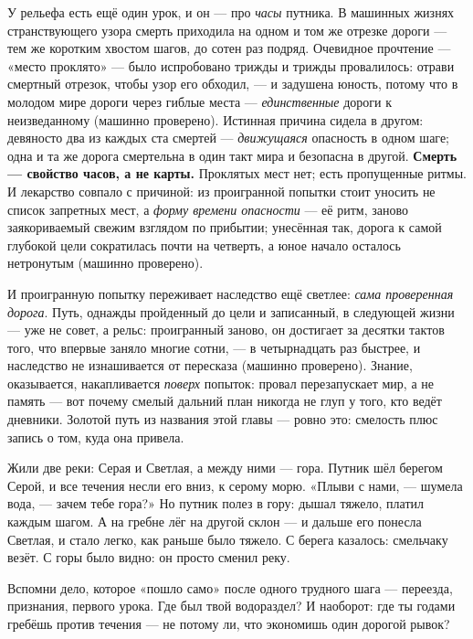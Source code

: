 \documentclass[11pt,letterpaper]{article}
\begin{document}
У рельефа есть ещё один урок, и он --- про \emph{часы} путника.
В машинных жизнях странствующего узора смерть приходила на одном и
том же отрезке дороги --- тем же коротким хвостом шагов, до сотен
раз подряд. Очевидное прочтение --- «место проклято» --- было
испробовано трижды и трижды провалилось: отрави смертный отрезок,
чтобы узор его обходил, --- и задушена юность, потому что в молодом
мире дороги через гиблые места --- \emph{единственные} дороги к
неизведанному (машинно проверено). Истинная причина сидела в
другом: девяносто два из каждых ста смертей --- \emph{движущаяся}
опасность в одном шаге; одна и та же дорога смертельна в один такт
мира и безопасна в другой. \textbf{Смерть --- свойство часов, а не
карты.} Проклятых мест нет; есть пропущенные ритмы. И лекарство
совпало с причиной: из проигранной попытки стоит уносить не список
запретных мест, а \emph{форму времени опасности} --- её ритм,
заново заякориваемый свежим взглядом по прибытии; унесённая так,
дорога к самой глубокой цели сократилась почти на четверть, а юное
начало осталось нетронутым (машинно проверено).

И проигранную попытку переживает наследство ещё светлее:
\emph{сама проверенная дорога}. Путь, однажды пройденный до цели и
записанный, в следующей жизни --- уже не совет, а рельс:
проигранный заново, он достигает за десятки тактов того, что
впервые заняло многие сотни, --- в четырнадцать раз быстрее, и
наследство не изнашивается от пересказа (машинно проверено).
Знание, оказывается, накапливается \emph{поверх} попыток: провал
перезапускает мир, а не память --- вот почему смелый дальний план
никогда не глуп у того, кто ведёт дневники. Золотой путь из
названия этой главы --- ровно это: смелость плюс запись о том,
куда она привела.

\begin{skazbox}
Жили две реки: Серая и Светлая, а между ними --- гора. Путник шёл
берегом Серой, и все течения несли его вниз, к серому морю. «Плыви с
нами, --- шумела вода, --- зачем тебе гора?» Но путник полез в гору:
дышал тяжело, платил каждым шагом. А на гребне лёг на другой склон
--- и дальше его понесла Светлая, и стало легко, как раньше было
тяжело. С берега казалось: смельчаку везёт. С горы было видно: он
просто сменил реку.
\end{skazbox}

\begin{askbox}
Вспомни дело, которое «пошло само» после одного трудного шага ---
переезда, признания, первого урока. Где был твой водораздел? И
наоборот: где ты годами гребёшь против течения --- не потому ли, что
экономишь один дорогой рывок?
\end{askbox}
\end{document}
